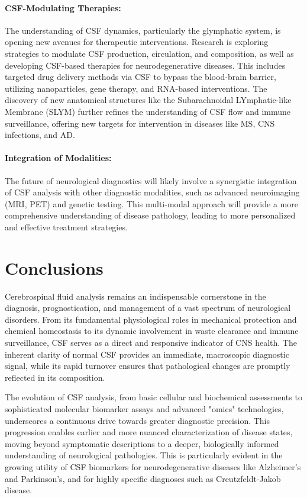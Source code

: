 	\paragraph{CSF-Modulating Therapies:} The understanding of CSF dynamics, particularly the glymphatic system, is opening new avenues for therapeutic interventions. Research is exploring strategies to modulate CSF production, circulation, and composition, as well as developing CSF-based therapies for neurodegenerative diseases. This includes targeted drug delivery methods via CSF to bypass the blood-brain barrier, utilizing nanoparticles, gene therapy, and RNA-based interventions. The discovery of new anatomical structures like the Subarachnoidal LYmphatic-like Membrane (SLYM) further refines the understanding of CSF flow and immune surveillance, offering new targets for intervention in diseases like MS, CNS infections, and AD.
	
	\paragraph{Integration of Modalities:} The future of neurological diagnostics will likely involve a synergistic integration of CSF analysis with other diagnostic modalities, such as advanced neuroimaging (MRI, PET) and genetic testing. This multi-modal approach will provide a more comprehensive understanding of disease pathology, leading to more personalized and effective treatment strategies.
	
	\section*{Conclusions}
	
	Cerebrospinal fluid analysis remains an indispensable cornerstone in the diagnosis, prognostication, and management of a vast spectrum of neurological disorders. From its fundamental physiological roles in mechanical protection and chemical homeostasis to its dynamic involvement in waste clearance and immune surveillance, CSF serves as a direct and responsive indicator of CNS health. The inherent clarity of normal CSF provides an immediate, macroscopic diagnostic signal, while its rapid turnover ensures that pathological changes are promptly reflected in its composition.
	
	The evolution of CSF analysis, from basic cellular and biochemical assessments to sophisticated molecular biomarker assays and advanced "omics" technologies, underscores a continuous drive towards greater diagnostic precision. This progression enables earlier and more nuanced characterization of disease states, moving beyond symptomatic descriptions to a deeper, biologically informed understanding of neurological pathologies. This is particularly evident in the growing utility of CSF biomarkers for neurodegenerative diseases like Alzheimer's and Parkinson's, and for highly specific diagnoses such as Creutzfeldt-Jakob disease.
	
